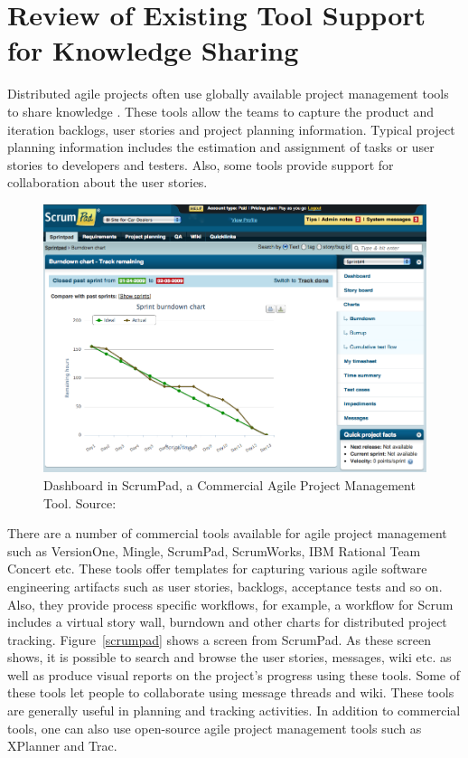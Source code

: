 \section{Review of Existing Tool Support for Knowledge Sharing}
Distributed agile projects often use globally available project management tools to share knowledge \cite{essential_communication}. These tools allow the teams to capture the product and iteration backlogs, user stories and project planning information. Typical project planning information includes the estimation and assignment of tasks or user stories to developers and testers. Also, some tools provide support for collaboration about the user stories.

\begin{figure}[bt]
	\centering
	\includegraphics[width=\textwidth]{Scrumpad.png}
    \caption{Dashboard in ScrumPad, a Commercial Agile Project Management Tool. Source: \cite{scrum_pad}}
	\label{fig:scrumpad}
\end{figure}


There are a number of commercial tools available for agile project management such as VersionOne\cite{version_one}, Mingle\cite{mingle}, ScrumPad\cite{scrum_pad}, ScrumWorks\cite{scrum_works}, IBM Rational Team Concert\cite{ibm_rtc} etc. These tools offer templates for capturing various agile software engineering artifacts such as user stories, backlogs, acceptance tests and so on. Also, they provide process specific workflows, for example, a workflow for Scrum includes a virtual story wall, burndown and other charts for distributed project tracking. Figure~\ref{scrumpad} shows a screen from ScrumPad. As these screen shows, it is possible to search and browse the user stories, messages, wiki etc. as well as produce visual reports on the project's progress using these tools. Some of these tools let people to collaborate using message threads and wiki. These tools are generally useful in planning and tracking activities. In addition to commercial tools, one can also use open-source agile project management tools such as XPlanner\cite{xplanner} and Trac\cite{trac}.

